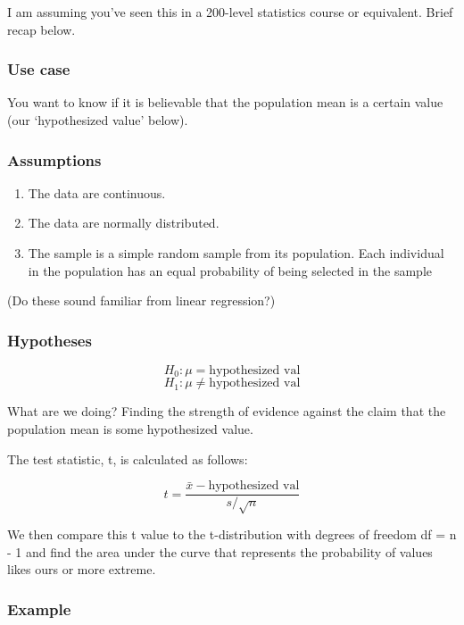 \documentclass[
]{book}
\providecommand{\tightlist}{%
  \setlength{\itemsep}{0pt}\setlength{\parskip}{0pt}}
\begin{document}
I am assuming you've seen this in a 200-level statistics course or equivalent. Brief recap below.

\hypertarget{use-case}{%
\subsubsection{Use case}\label{use-case}}

You want to know if it is believable that the population mean is a certain value (our `hypothesized value' below).

\hypertarget{assumptions}{%
\subsubsection{Assumptions}\label{assumptions}}

\begin{enumerate}
\def\labelenumi{\arabic{enumi}.}
\tightlist
\item
  The data are continuous.
\item
  The data are normally distributed.
\item
  The sample is a simple random sample from its population. Each individual in the population has an equal probability of being selected in the sample
\end{enumerate}

(Do these sound familiar from linear regression?)

\hypertarget{hypotheses}{%
\subsubsection{Hypotheses}\label{hypotheses}}

\[H_0: \mu = \text{hypothesized val}\]
\[H_1: \mu \ne \text{hypothesized val}\]

What are we doing? Finding the strength of evidence against the claim that the population mean is some hypothesized value.

The test statistic, t, is calculated as follows:

\[ t = \frac{\bar{x} - \text{hypothesized val}}{s/\sqrt{n}} \]

We then compare this t value to the t-distribution with degrees of freedom df = n - 1 and find the area under the curve that represents the probability of values likes ours or more extreme.

\hypertarget{example-1}{%
\subsubsection{Example}\label{example-1}}
\end{document}
